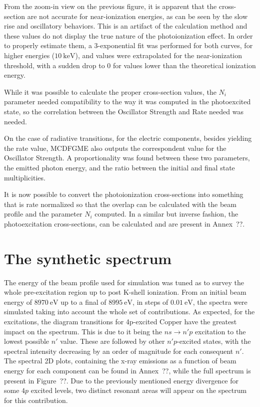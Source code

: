 
From the zoom-in view on the previous figure, it is apparent that the cross-section are not accurate for near-ionization energies, as can be seen by the slow rise and oscillatory behaviors. This is an artifact of the calculation method and these values do not display the true nature of the photoionization effect. In order to properly estimate them, a 3-exponential fit was performed for both curves, for higher energies ($10\ \si{\kilo\electronvolt}$), and values were extrapolated for the near-ionization threshold, with a sudden drop to 0 for values lower than the theoretical ionization energy.


While it was possible to calculate the proper cross-section values, the $N_i$ parameter needed compatibility to the way it was computed in the photoexcited state, so the correlation between the Oscillator Strength and Rate needed was needed.


On the case of radiative transitions, for the electric components, besides yielding the rate value, \gls{MCDFGME} also outputs the correspondent value for the Oscillator Strength. A proportionality was found between these two parameters, the emitted photon energy, and the ratio between the initial and final state multiplicities.


It is now possible to convert the photoionization cross-sections into something that is rate normalized so that the overlap can be calculated with the beam profile and the parameter $N_i$ computed. In a similar but inverse fashion, the photoexcitation cross-sections, can be calculated and are present in Annex~??.


\section{The synthetic spectrum}

The energy of the beam profile used for simulation was tuned as to survey the whole pre-excitation region up to post K-shell ionization. From an initial beam energy of $8970\ \si{\electronvolt}$ up to a final of $8995\ \si{\electronvolt}$, in steps of $0.01\ \si{\electronvolt}$, the spectra were simulated taking into account the whole set of contributions. As expected, for the excitations, the diagram transitions for 4p-excited Copper have the greatest impact on the spectrum. This is due to it being the $ns\rightarrow n' p$ excitation to the lowest possible $n'$ value. These are followed by other $n'p$-excited states, with the spectral intensity decreasing by an order of magnitude for each consequent $n'$. The spectral 2D plots, containing the x-ray emissions as a function of beam energy for each component can be found in Annex~??, while the full spectrum is present in Figure~??. Due to the previously mentioned energy divergence for some $4p$ excited levels, two distinct resonant areas will appear on the spectrum for this contribution.

